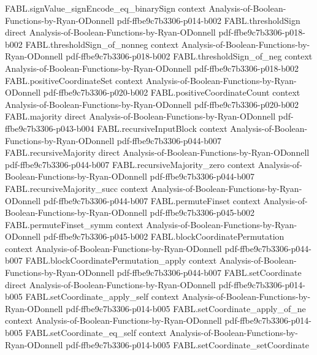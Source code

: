 \begin{theorem}
\proofstep
  {FABL.signValue_signEncode_eq_binarySign}
  {context}
  {Analysis-of-Boolean-Functions-by-Ryan-ODonnell}
  {pdf-ffbe9c7b3306-p014-b002}
\proofstep
  {FABL.thresholdSign}
  {direct}
  {Analysis-of-Boolean-Functions-by-Ryan-ODonnell}
  {pdf-ffbe9c7b3306-p018-b002}
\proofstep
  {FABL.thresholdSign_of_nonneg}
  {context}
  {Analysis-of-Boolean-Functions-by-Ryan-ODonnell}
  {pdf-ffbe9c7b3306-p018-b002}
\proofstep
  {FABL.thresholdSign_of_neg}
  {context}
  {Analysis-of-Boolean-Functions-by-Ryan-ODonnell}
  {pdf-ffbe9c7b3306-p018-b002}
\proofstep
  {FABL.positiveCoordinateSet}
  {context}
  {Analysis-of-Boolean-Functions-by-Ryan-ODonnell}
  {pdf-ffbe9c7b3306-p020-b002}
\proofstep
  {FABL.positiveCoordinateCount}
  {context}
  {Analysis-of-Boolean-Functions-by-Ryan-ODonnell}
  {pdf-ffbe9c7b3306-p020-b002}
\proofstep
  {FABL.majority}
  {direct}
  {Analysis-of-Boolean-Functions-by-Ryan-ODonnell}
  {pdf-ffbe9c7b3306-p043-b004}
\proofstep
  {FABL.recursiveInputBlock}
  {context}
  {Analysis-of-Boolean-Functions-by-Ryan-ODonnell}
  {pdf-ffbe9c7b3306-p044-b007}
\proofstep
  {FABL.recursiveMajority}
  {direct}
  {Analysis-of-Boolean-Functions-by-Ryan-ODonnell}
  {pdf-ffbe9c7b3306-p044-b007}
\proofstep
  {FABL.recursiveMajority_zero}
  {context}
  {Analysis-of-Boolean-Functions-by-Ryan-ODonnell}
  {pdf-ffbe9c7b3306-p044-b007}
\proofstep
  {FABL.recursiveMajority_succ}
  {context}
  {Analysis-of-Boolean-Functions-by-Ryan-ODonnell}
  {pdf-ffbe9c7b3306-p044-b007}
\proofstep
  {FABL.permuteFinset}
  {context}
  {Analysis-of-Boolean-Functions-by-Ryan-ODonnell}
  {pdf-ffbe9c7b3306-p045-b002}
\proofstep
  {FABL.permuteFinset_symm}
  {context}
  {Analysis-of-Boolean-Functions-by-Ryan-ODonnell}
  {pdf-ffbe9c7b3306-p045-b002}
\proofstep
  {FABL.blockCoordinatePermutation}
  {context}
  {Analysis-of-Boolean-Functions-by-Ryan-ODonnell}
  {pdf-ffbe9c7b3306-p044-b007}
\proofstep
  {FABL.blockCoordinatePermutation_apply}
  {context}
  {Analysis-of-Boolean-Functions-by-Ryan-ODonnell}
  {pdf-ffbe9c7b3306-p044-b007}
\proofstep
  {FABL.setCoordinate}
  {direct}
  {Analysis-of-Boolean-Functions-by-Ryan-ODonnell}
  {pdf-ffbe9c7b3306-p014-b005}
\proofstep
  {FABL.setCoordinate_apply_self}
  {context}
  {Analysis-of-Boolean-Functions-by-Ryan-ODonnell}
  {pdf-ffbe9c7b3306-p014-b005}
\proofstep
  {FABL.setCoordinate_apply_of_ne}
  {context}
  {Analysis-of-Boolean-Functions-by-Ryan-ODonnell}
  {pdf-ffbe9c7b3306-p014-b005}
\proofstep
  {FABL.setCoordinate_eq_self}
  {context}
  {Analysis-of-Boolean-Functions-by-Ryan-ODonnell}
  {pdf-ffbe9c7b3306-p014-b005}
\proofstep
  {FABL.setCoordinate_setCoordinate}

\end{theorem}
